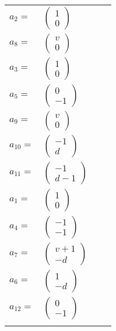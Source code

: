 \documentclass[1p]{elsarticle_modified}
\theoremstyle{definition}
\begin{document}
\begin{tabular}{m{7pt} m{180pt} m{7pt} m{180pt} }
\flushright $a_{2}=$&$\begin{pmatrix}1\\0\end{pmatrix}$ \\
\flushright $a_{8}=$&$\begin{pmatrix}v\\0\end{pmatrix}$ \\
\flushright $a_{3}=$&$\begin{pmatrix}1\\0\end{pmatrix}$ \\
\flushright $a_{5}=$&$\begin{pmatrix}0\\-1\end{pmatrix}$ \\
\flushright $a_{9}=$&$\begin{pmatrix}v\\0\end{pmatrix}$ \\
\flushright $a_{10}=$&$\begin{pmatrix}-1\\d\end{pmatrix}$ \\
\flushright $a_{11}=$&$\begin{pmatrix}-1\\d-1\end{pmatrix}$ \\
\flushright $a_{1}=$&$\begin{pmatrix}1\\0\end{pmatrix}$ \\
\flushright $a_{4}=$&$\begin{pmatrix}-1\\-1\end{pmatrix}$ \\
\flushright $a_{7}=$&$\begin{pmatrix}v+1\\- d\end{pmatrix}$ \\
\flushright $a_{6}=$&$\begin{pmatrix}1\\- d\end{pmatrix}$ \\
\flushright $a_{12}=$&$\begin{pmatrix}0\\-1\end{pmatrix}$\\&\end{tabular}
\end{document}
